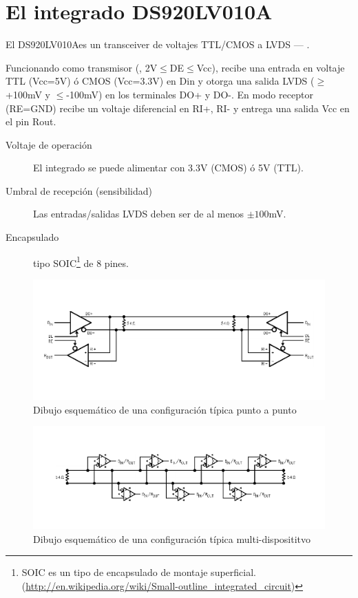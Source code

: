 \documentclass[a4paper]{article}
\begin{document}
%
\sffamily
%
\maketitle
%
\newcommand{\ic}{DS920LV010A} %
% 
\section{El integrado \ic}
%
El \ic es un transceiver de voltajes TTL/CMOS a LVDS --- .

Funcionando como transmisor (, 2V$\leq$DE$\leq$Vcc), recibe una entrada en voltaje TTL
(Vcc=5V) ó CMOS (Vcc=3.3V) en Din y otorga una salida LVDS ($\geq$+100mV y $\leq$-100mV) en los terminales DO+ y DO-.
En modo receptor (RE=GND) recibe un voltaje diferencial en RI+, RI- y entrega una salida Vcc en el
pin Rout.
%
\begin{description}
\item[Voltaje de operación] El integrado se puede alimentar con 3.3V (CMOS) ó 5V (TTL).
\item[Umbral de recepción (sensibilidad)] Las entradas/salidas LVDS deben ser de al menos $\pm 100$mV.
\item[Encapsulado] tipo SOIC\footnote{SOIC es un tipo de encapsulado de montaje superficial. (\url{http://en.wikipedia.org/wiki/Small-outline_integrated_circuit})} de 8 pines.
\end{description}
%
%
\begin{figure}[h]
\includegraphics[width=15cm]{img/ej1a}
\caption{Dibujo esquemático de una configuración típica punto a punto}
\end{figure}
%
\begin{figure}[H]
\includegraphics[width=15cm]{img/ej1b}
\caption{Dibujo esquemático de una configuración típica multi-disposititvo}
\end{figure}
%
\renewcommand{\ic}{DS90CR283} %
\end{document}
